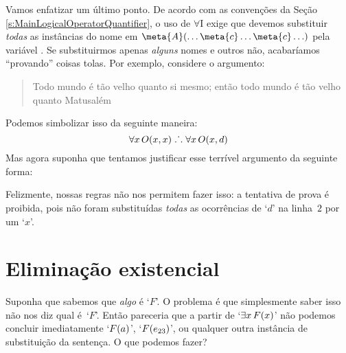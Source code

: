 Vamos enfatizar um último ponto. De acordo com as convenções da Seção \ref{s:MainLogicalOperatorQuantifier}, o uso de $\forall$I exige que devemos substituir  \emph{todas} as instâncias do nome  em $\meta{A}(\ldots \meta{c}\ldots\meta{c}\ldots)$ pela variável . Se substituirmos apenas \emph{alguns} nomes e outros não, acabaríamos ``provando'' coisas tolas. Por exemplo, considere o argumento:
	\begin{quote}
	Todo mundo é tão velho quanto si mesmo; então todo mundo é tão velho quanto Matusalém
	\end{quote}
Podemos simbolizar isso da seguinte maneira:
$$\forall x\,\mathord{O}(x,x) \mathrel{\ldotp\dot{}\,\ldotp} \forall x\,\mathord{O}(x,d)$$
Mas agora suponha que tentamos justificar esse terrível argumento da seguinte forma:
\begin{fitchproof}
\end{fitchproof}
Felizmente, nossas regras não nos permitem fazer isso: a tentativa de prova é proibida, pois não foram substituídas \emph{todas} as ocorrências de `$d$' na linha~$2$ por um `$x$'.

\section{Eliminação  existencial}
Suponha que sabemos que \emph{algo}  é `$F$'. O problema é que simplesmente saber isso não nos diz qual é~`$F$'. Então pareceria que a partir de `$\exists x\,\mathord{F}(x)$' não podemos concluir imediatamente `$\mathord{F}(a)$', `$\mathord{F}(e_{23})$', ou qualquer outra instância de substituição da sentença. O que podemos fazer?
 
